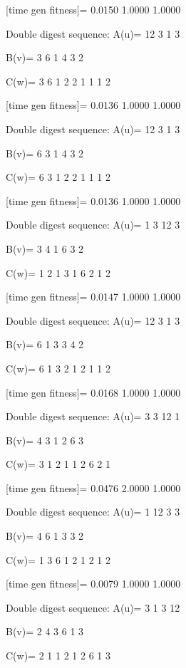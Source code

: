 [time gen fitness]=
    0.0150    1.0000    1.0000

Double digest sequence:
A(u)=
    12     3     1     3

B(v)=
     3     6     1     4     3     2

C(w)=
     3     6     1     2     2     1     1     1     2

[time gen fitness]=
    0.0136    1.0000    1.0000

Double digest sequence:
A(u)=
    12     3     1     3

B(v)=
     6     3     1     4     3     2

C(w)=
     6     3     1     2     2     1     1     1     2

[time gen fitness]=
    0.0136    1.0000    1.0000

Double digest sequence:
A(u)=
     1     3    12     3

B(v)=
     3     4     1     6     3     2

C(w)=
     1     2     1     3     1     6     2     1     2

[time gen fitness]=
    0.0147    1.0000    1.0000

Double digest sequence:
A(u)=
    12     3     1     3

B(v)=
     6     1     3     3     4     2

C(w)=
     6     1     3     2     1     2     1     1     2

[time gen fitness]=
    0.0168    1.0000    1.0000

Double digest sequence:
A(u)=
     3     3    12     1

B(v)=
     4     3     1     2     6     3

C(w)=
     3     1     2     1     1     2     6     2     1

[time gen fitness]=
    0.0476    2.0000    1.0000

Double digest sequence:
A(u)=
     1    12     3     3

B(v)=
     4     6     1     3     3     2

C(w)=
     1     3     6     1     2     1     2     1     2

[time gen fitness]=
    0.0079    1.0000    1.0000

Double digest sequence:
A(u)=
     3     1     3    12

B(v)=
     2     4     3     6     1     3

C(w)=
     2     1     1     2     1     2     6     1     3

